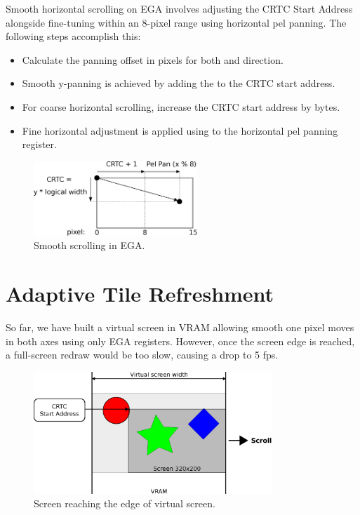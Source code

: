 \documentclass[book.tex]{subfiles}
\begin{document}
\begin{minipage}{\textwidth}
  
  \end{minipage}
  \label{ega_pel_pan}
 
\par
Smooth horizontal scrolling on EGA involves adjusting the CRTC Start Address alongside fine-tuning within an 8-pixel range using horizontal pel panning. The following steps accomplish this:
\begin{itemize}
  \item Calculate the panning offset in pixels for both  and direction.
  \item Smooth y-panning is achieved by adding the  to the CRTC start address.
  \item For coarse horizontal scrolling, increase the CRTC start address by  bytes.
  \item Fine horizontal adjustment is applied using  to the horizontal pel panning register.
\end{itemize}


\begin{figure}[H]
\centering
\includegraphics[width=0.55\textwidth]{imgs/drawings/Tile_Refresh.eps}
\caption{Smooth scrolling in EGA.}
\label{fig:tile_refresh}
\end{figure}


\section{Adaptive Tile Refreshment}
So far, we have built a virtual screen in VRAM allowing smooth one pixel moves in both axes using only EGA registers. However, once the screen edge is reached, a full-screen redraw would be too slow, causing a drop to 5 fps.\\


\begin{figure}[H]
\centering
\includegraphics[width=0.8\textwidth]{imgs/drawings/screen_edge.eps}
\caption{Screen reaching the edge of virtual screen.}
\label{fig:screen_edge}
\end{figure}
\end{document}
